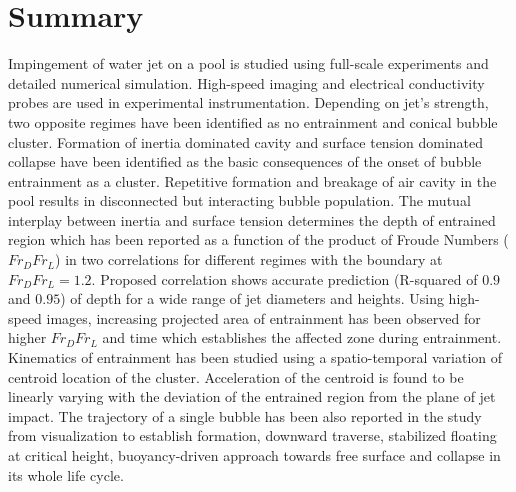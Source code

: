 \section{Summary}
Impingement of water jet on a pool is studied using full-scale experiments and detailed numerical simulation. High-speed imaging and electrical conductivity probes are used in experimental instrumentation. Depending on jet's strength, two opposite regimes have been identified as no entrainment and conical bubble cluster. Formation of inertia dominated cavity and surface tension dominated collapse have been identified as the basic consequences of the onset of bubble entrainment as a cluster. Repetitive formation and breakage of air cavity in the pool results in disconnected but interacting bubble population. The mutual interplay between inertia and surface tension determines the depth of entrained region which has been reported as a function of the product of Froude Numbers  ($Fr_DFr_L$) in two correlations for different regimes with the boundary at $Fr_DFr_L = 1.2$. Proposed correlation shows accurate prediction (R-squared of $0.9$ and $0.95$) of depth for a wide range of jet diameters and heights. Using high-speed images, increasing projected area of entrainment has been observed for higher $Fr_DFr_L$ and time which establishes the affected zone during entrainment. Kinematics of entrainment has been studied using a spatio-temporal variation of centroid location of the cluster. Acceleration of the centroid is found to be linearly varying with the deviation of the entrained region from the plane of jet impact. The trajectory of a single bubble has been also reported in the study from visualization to establish formation, downward traverse, stabilized floating at critical height, buoyancy-driven approach towards free surface and collapse in its whole life cycle.
